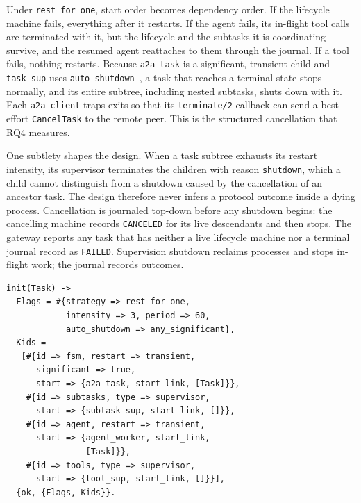 \documentclass[conference,letterpaper]{IEEEtran}
\newcommand{\code}[1]{\texttt{#1}}
\begin{document}
Under \code{rest\_for\_one}, start order becomes dependency order. If the
lifecycle machine fails, everything after it restarts. If the agent fails,
its in-flight tool calls are terminated with it, but the lifecycle and the
subtasks it is coordinating survive, and the resumed agent reattaches to them
through the journal. If a tool fails, nothing restarts. Because
\code{a2a\_task} is a significant, transient child and \code{task\_sup} uses
\code{auto\_shutdown}~\cite{otp-sup}, a task that reaches a terminal state
stops normally, and its entire subtree, including nested subtasks, shuts
down with it. Each \code{a2a\_client} traps exits so that its
\code{terminate/2} callback can send a best-effort \code{CancelTask} to the
remote peer. This is the structured cancellation that RQ4 measures.

One subtlety shapes the design. When a task subtree exhausts its restart
intensity, its supervisor terminates the children with reason
\code{shutdown}, which a child cannot distinguish from a shutdown caused by
the cancellation of an ancestor task. The design therefore never infers a
protocol outcome inside a dying process. Cancellation is journaled top-down
before any shutdown begins: the cancelling machine records
\code{CANCELED} for its live descendants and then stops. The gateway
reports any task that has neither a live lifecycle machine nor a terminal
journal record as \code{FAILED}. Supervision shutdown reclaims processes and
stops in-flight work; the journal records outcomes.

\begin{lstlisting}[float=t, caption={Per-task supervisor. Start order
encodes dependency; the significant lifecycle child triggers automatic
shutdown of the whole task subtree.}, label={lst:sup}]
init(Task) ->
  Flags = #{strategy => rest_for_one,
            intensity => 3, period => 60,
            auto_shutdown => any_significant},
  Kids =
   [#{id => fsm, restart => transient,
      significant => true,
      start => {a2a_task, start_link, [Task]}},
    #{id => subtasks, type => supervisor,
      start => {subtask_sup, start_link, []}},
    #{id => agent, restart => transient,
      start => {agent_worker, start_link,
                [Task]}},
    #{id => tools, type => supervisor,
      start => {tool_sup, start_link, []}}],
  {ok, {Flags, Kids}}.
\end{lstlisting}
\end{document}
